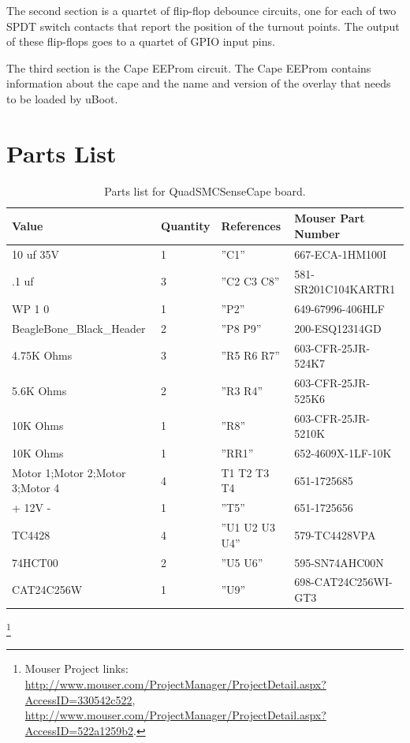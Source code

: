 The second section is a quartet of flip-flop debounce circuits, one for each
of two SPDT switch contacts that report the position of the turnout points.
The output of these flip-flops goes to a quartet of GPIO input pins.

The third section is the Cape EEProm circuit.  The Cape EEProm contains 
information about the cape and the name and version of the overlay that needs 
to be loaded by uBoot.

\section{Parts List}

\begin{table}[htdp]
\begin{centering}\begin{tabular}{|l|l|p{1in}|l|}
\hline
Value&Quantity&References&Mouser Part Number \\
\hline
10 uf 35V&1&''C1''&667-ECA-1HM100I \\
\hline
.1 uf&3&''C2 C3 C8''&581-SR201C104KARTR1 \\
\hline
WP 1 0&1&''P2''&649-67996-406HLF \\
\hline
BeagleBone\_Black\_Header&2&''P8 P9''&200-ESQ12314GD \\
\hline
4.75K Ohms&3&''R5 R6 R7''&603-CFR-25JR-524K7 \\
\hline 
5.6K Ohms&2&''R3 R4''&603-CFR-25JR-525K6 \\
\hline
10K Ohms&1&''R8''&603-CFR-25JR-5210K \\
\hline
10K Ohms&1&''RR1''&652-4609X-1LF-10K \\
\hline
Motor 1;Motor 2;Motor 3;Motor 4&4&T1 T2 T3 T4&651-1725685 \\
\hline
+ 12V -&1&''T5''&651-1725656 \\
\hline
TC4428&4&''U1 U2 U3 U4''&579-TC4428VPA \\
\hline
74HCT00&2&''U5 U6''&595-SN74AHC00N \\
\hline
CAT24C256W&1&''U9''&698-CAT24C256WI-GT3 \\
\hline
\end{tabular}
\caption{Parts list for QuadSMCSenseCape board.}
\end{centering}\end{table}\footnote{Mouser Project links: 
\url{http://www.mouser.com/ProjectManager/ProjectDetail.aspx?AccessID=330542c522},
\url{http://www.mouser.com/ProjectManager/ProjectDetail.aspx?AccessID=522a1259b2}.}


